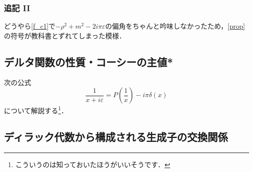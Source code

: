 \documentclass[a4paper,pdflatex,ja=standard]{bxjsarticle}
\begin{document}
\subsubsection{追記 II}
\label{ps2}
どうやら\eqref{f_c1}で$-\rho^2+m^2-2i\pi\varepsilon$の偏角をちゃんと吟味しなかったため，\eqref{prop}の符号が教科書とずれてしまった模様．

\subsection{デルタ関数の性質・コーシーの主値*}

次の公式
\begin{equation}
  \frac{1}{x+i\varepsilon}
  =
  P\left( \frac{1}{x} \right)
  -
  i\pi\delta(x)
\end{equation}
について解説する\footnote{
  こういうのは知っておいたほうがいいそうです．
}．




\subsection{ディラック代数から構成される生成子の交換関係}
\end{document}
